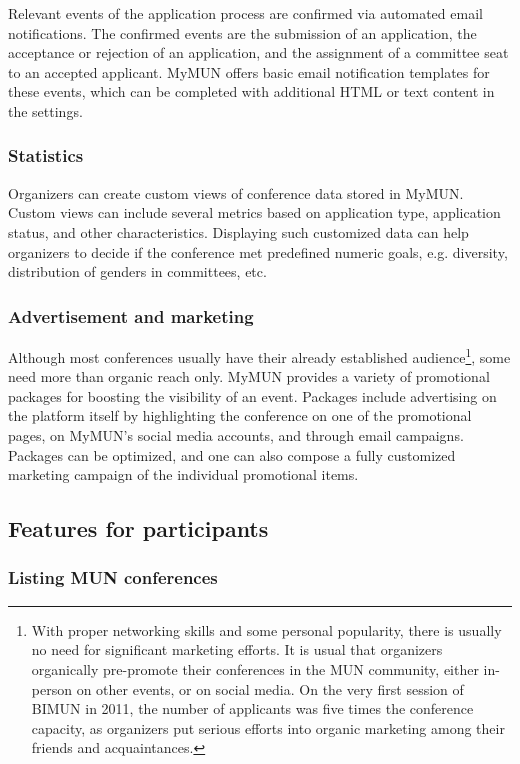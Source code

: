 Relevant events of the application process are confirmed via automated email notifications. The confirmed events are the submission of an application, the acceptance or rejection of an application, and the assignment of a committee seat to an accepted applicant. MyMUN offers basic email notification templates for these events, which can be completed with additional HTML or text content in the settings.

\subsubsection{Statistics}

Organizers can create custom views of conference data stored in MyMUN. Custom views can include several metrics based on application type, application status, and other characteristics. Displaying such customized data can help organizers to decide if the conference met predefined numeric goals, e.g. diversity, distribution of genders in committees, etc.

\subsubsection{Advertisement and marketing}

Although most conferences usually have their already established audience\footnote{With proper networking skills and some personal popularity, there is usually no need for significant marketing efforts. It is usual that organizers organically pre-promote their conferences in the MUN community, either in-person on other events, or on social media. On the very first session of BIMUN in 2011, the number of applicants was five times the conference capacity, as organizers put serious efforts into organic marketing among their friends and acquaintances.}, some need more than organic reach only. MyMUN provides a variety of promotional packages for boosting the visibility of an event. Packages include advertising on the platform itself by highlighting the conference on one of the promotional pages, on MyMUN's social media accounts, and through email campaigns. Packages can be optimized, and one can also compose a fully customized marketing campaign of the individual promotional items.

\subsection{Features for participants}

\subsubsection{Listing MUN conferences}

